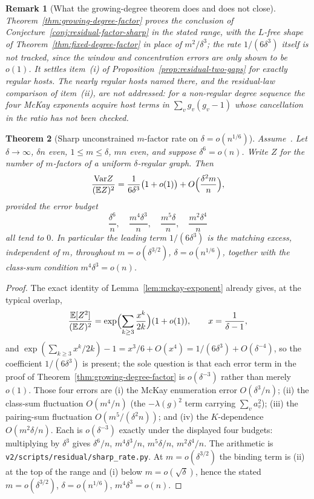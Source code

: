 \documentclass[11pt]{article}
\newtheorem{theorem}{Theorem}
\newtheorem{remark}[theorem]{Remark}
\newcommand{\EE}{\mathbb{E}}
\newcommand{\Var}{\mathrm{Var}}
\begin{document}
\begin{remark}[What the growing-degree theorem does and does not close]
\label{rem:growing-degree-scope}
Theorem~\ref{thm:growing-degree-factor} proves the conclusion of
Conjecture~\ref{conj:residual-factor-sharp} in the stated range, with the
\(L\)-free shape of Theorem~\ref{thm:fixed-degree-factor} in place of
\(m^2/\delta^3\); the rate \(1/(6\delta^3)\) itself is not tracked, since the
window and concentration errors are only shown to be \(o(1)\).
It settles item~(i) of Proposition~\ref{prop:residual-two-gaps} for exactly
regular hosts. The nearly regular hosts named there, and the residual-law
comparison of item~(ii), are not addressed: for a non-regular degree
sequence the four McKay exponents acquire host terms in
\(\sum_vg_v(g_v-1)\) whose cancellation in the ratio has not been checked.
\end{remark}

\begin{theorem}[Sharp unconstrained \(m\)-factor rate on \(\delta=o(n^{1/6})\)]
\label{thm:sharp-rate-short}
Assume~\cite[Theorem~14]{Gao21}. Let \(\delta\to\infty\), \(\delta n\) even,
\(1\le m\le\delta\), \(mn\) even, and suppose \(\delta^6=o(n)\). Write \(Z\) for
the number of \(m\)-factors of a uniform \(\delta\)-regular graph. Then
\[
\frac{\Var Z}{(\EE Z)^2}
=
\frac1{6\delta^3}\bigl(1+o(1)\bigr)
+
O\Bigl(\frac{\delta^2 m}{n}\Bigr),
\]
provided the error budget
\[
\frac{\delta^6}{n},\quad \frac{m^4\delta^3}{n},\quad \frac{m^5\delta}{n},\quad \frac{m^2\delta^4}{n}
\]
all tend to \(0\). In particular the leading term \(1/(6\delta^3)\) is the
matching excess, independent of \(m\), throughout
\(m=o(\delta^{3/2})\), \(\delta=o(n^{1/6})\), together with the class-sum
condition \(m^4\delta^3=o(n)\).
\end{theorem}

\begin{proof}
The exact identity of Lemma~\ref{lem:mckay-exponent} already gives, at the
typical overlap,
\[
\frac{\EE[Z^2]}{(\EE Z)^2}
=
\exp\Bigl(\sum_{k\ge3}\frac{x^k}{2k}\Bigr)(1+o(1)),
\qquad
x=\frac1{\delta-1},
\]
and \(\exp(\sum_{k\ge3}x^k/2k)-1=x^3/6+O(x^4)=1/(6\delta^3)+O(\delta^{-4})\), so the
coefficient \(1/(6\delta^3)\) is present; the sole question is that each error
term in the proof of Theorem~\ref{thm:growing-degree-factor} is \(o(\delta^{-3})\)
rather than merely \(o(1)\). Those four errors are (i) the McKay enumeration
error \(O(\delta^3/n)\); (ii) the class-sum fluctuation \(O(m^4/n)\) (the
\(-\lambda(g)^2\) term carrying \(\sum_v a_v^2\)); (iii) the pairing-sum
fluctuation \(O(m^5/(\delta^2 n))\); and (iv) the \(K\)-dependence
\(O(m^2\delta/n)\). Each is \(o(\delta^{-3})\) exactly under the displayed four
budgets: multiplying by \(\delta^3\) gives \(\delta^6/n\), \(m^4\delta^3/n\),
\(m^5\delta/n\), \(m^2\delta^4/n\). The arithmetic is
\texttt{v2/scripts/residual/sharp\_rate.py}. At \(m=o(\delta^{3/2})\) the binding
term is (ii) at the top of the range and (i) below \(m=o(\sqrt\delta)\), hence the
stated \(m=o(\delta^{3/2})\), \(\delta=o(n^{1/6})\), \(m^4\delta^3=o(n)\).
\end{proof}
\end{document}

